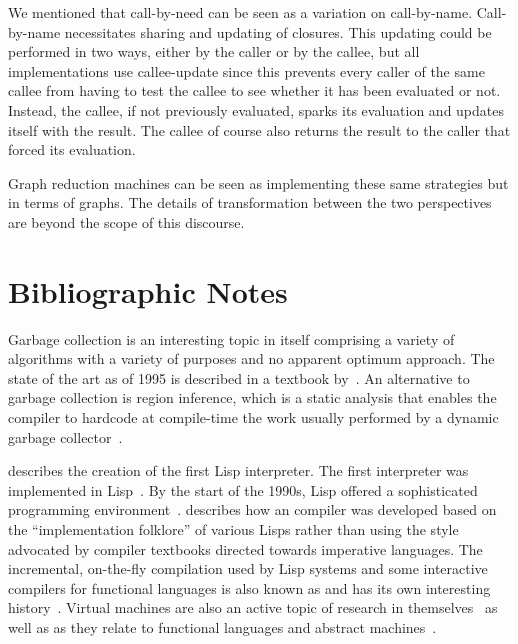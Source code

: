 We mentioned that call-by-need can be seen as a variation on call-by-name. Call-by-name necessitates sharing and updating of closures. This updating could be performed in two ways, either by the caller or by the callee, but all implementations use callee-update since this prevents every caller of the same callee from having to test the callee to see whether it has been evaluated or not. Instead, the callee, if not previously evaluated, sparks its evaluation and updates itself with the result. The callee of course also returns the result to the caller that forced its evaluation.

Graph reduction machines can be seen as implementing these same strategies but in terms of graphs. The details of transformation between the two perspectives are beyond the scope of this discourse.

\section{Bibliographic Notes}
Garbage collection is an interesting topic in itself comprising a variety of algorithms with a variety of purposes and no apparent optimum approach. The state of the art as of 1995 is described in a textbook by~\citet{Jones:Garbage:1996}. An alternative to garbage collection is region inference, which is a static analysis that enables the compiler to hardcode at compile-time the work usually performed by a dynamic garbage collector~\citep{Tofte:A-region:1998}.

 describes the creation of the first Lisp interpreter. The first interpreter was implemented in Lisp~\citep[see][footnote~5]{Gordon:From:2000}. By the start of the 1990s, Lisp offered a sophisticated programming environment~\citep{Layer:Lisp:1991}.  describes how an  compiler was developed based on the ``implementation folklore'' of various Lisps rather than using the style advocated by compiler textbooks directed towards imperative languages. The incremental, on-the-fly compilation used by Lisp systems and some interactive compilers for functional languages is also known as  and has its own interesting history~\citep{Aycock:A-brief:2003}. Virtual machines are also an active topic of research in themselves~\citep{Shi:Virtual:2008} as well as as they relate to functional languages and abstract machines~\citep{Danvy:A-journey:2003,Ager:A-functional:2003,Ager:A-Functional:2003a,Ager:A-Functional:2004,Ager:From:2003}.

